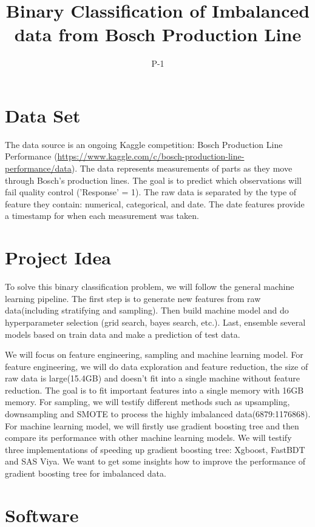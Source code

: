 \documentclass{article}
\title{Binary Classification of Imbalanced data from Bosch Production Line}
\author{
    P-1
}
\begin{document}

\maketitle

\section{Data Set}

The data source is an ongoing Kaggle competition: Bosch Production Line Performance (\url{https://www.kaggle.com/c/bosch-production-line-performance/data}). The data represents measurements of parts as they move through Bosch's production lines. The goal is to predict which observations will fail quality control ('Response' = 1). The raw data is separated by the type of feature they contain: numerical, categorical, and date. The date features provide a timestamp for when each measurement was taken.

\section{Project Idea}

To solve this binary classification problem, we will follow the general machine learning pipeline. The first step is to generate new features from raw data(including stratifying and sampling). Then build machine model and do hyperparameter selection (grid search, bayes search, etc.). Last, ensemble several models based on train data and make a prediction of test data.

We will focus on feature engineering, sampling and machine learning model. For feature engineering, we will do data exploration and feature reduction, the size of raw data is large(15.4GB) and doesn't fit into a single machine without feature reduction. The goal is to fit important features into a single memory with 16GB memory. For sampling, we will testify different methods such as upsampling, downsampling and SMOTE to process the highly imbalanced data(6879:1176868). For machine learning model, we will firstly use gradient boosting tree and then compare its performance with other machine learning models. We will testify three implementations of speeding up gradient boosting tree: Xgboost, FastBDT and SAS Viya. We want to get some insights how to improve the performance of gradient boosting tree for imbalanced data.

\section{Software}
\end{document}

